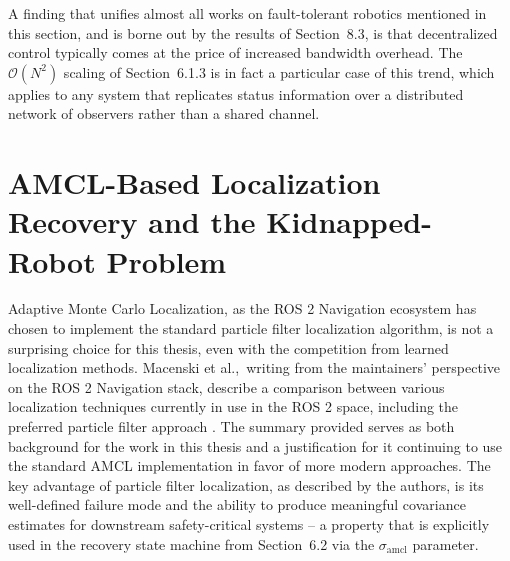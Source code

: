 A finding that unifies almost all works on fault-tolerant robotics mentioned in this section, and is borne out by the results of Section~8.3, is that decentralized control typically comes at the price of increased bandwidth overhead. The $\mathcal{O}(N^2)$ scaling of Section~6.1.3 is in fact a particular case of this trend, which applies to any system that replicates status information over a distributed network of observers rather than a shared channel.

\section{AMCL-Based Localization Recovery and the Kidnapped-Robot Problem}

Adaptive Monte Carlo Localization, as the ROS 2 Navigation ecosystem has chosen to implement the standard particle filter localization algorithm, is not a surprising choice for this thesis, even with the competition from learned localization methods. Macenski et al.,\ writing from the maintainers' perspective on the ROS 2 Navigation stack, describe a comparison between various localization techniques currently in use in the ROS 2 space, including the preferred particle filter approach \cite{macenski2023fromdesks}. The summary provided serves as both background for the work in this thesis and a justification for it continuing to use the standard AMCL implementation in favor of more modern approaches. The key advantage of particle filter localization, as described by the authors, is its well-defined failure mode and the ability to produce meaningful covariance estimates for downstream safety-critical systems – a property that is explicitly used in the recovery state machine from Section~6.2 via the $\sigma_{\text{amcl}}$ parameter.


